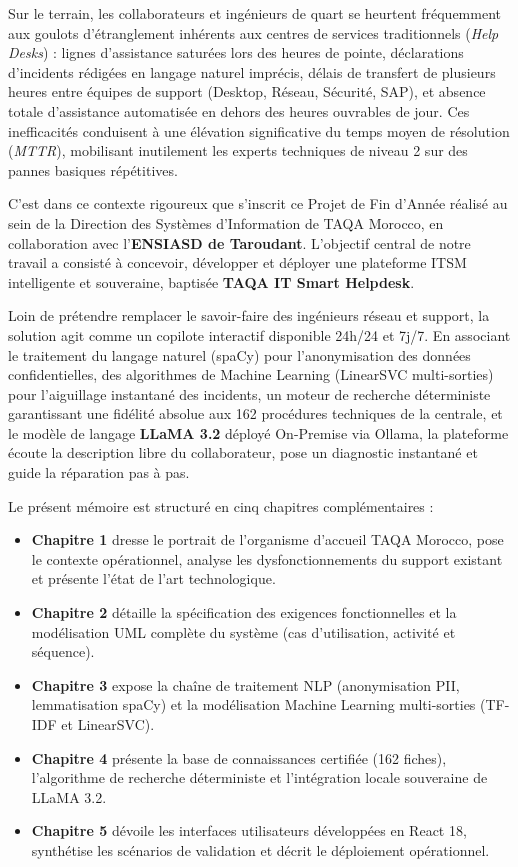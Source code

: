 \documentclass[12pt, a4paper, oneside]{report}
\begin{document}
Sur le terrain, les collaborateurs et ingénieurs de quart se heurtent fréquemment aux goulots d'étranglement inhérents aux centres de services traditionnels (\textit{Help Desks}) : lignes d'assistance saturées lors des heures de pointe, déclarations d'incidents rédigées en langage naturel imprécis, délais de transfert de plusieurs heures entre équipes de support (Desktop, Réseau, Sécurité, SAP), et absence totale d'assistance automatisée en dehors des heures ouvrables de jour. Ces inefficacités conduisent à une élévation significative du temps moyen de résolution (\textit{MTTR}), mobilisant inutilement les experts techniques de niveau 2 sur des pannes basiques répétitives.

C'est dans ce contexte rigoureux que s'inscrit ce Projet de Fin d'Année réalisé au sein de la Direction des Systèmes d'Information de TAQA Morocco, en collaboration avec l'\textbf{ENSIASD de Taroudant}. L'objectif central de notre travail a consisté à concevoir, développer et déployer une plateforme ITSM intelligente et souveraine, baptisée \textbf{TAQA IT Smart Helpdesk}.

Loin de prétendre remplacer le savoir-faire des ingénieurs réseau et support, la solution agit comme un copilote interactif disponible 24h/24 et 7j/7. En associant le traitement du langage naturel (spaCy) pour l'anonymisation des données confidentielles, des algorithmes de Machine Learning (LinearSVC multi-sorties) pour l'aiguillage instantané des incidents, un moteur de recherche déterministe garantissant une fidélité absolue aux 162 procédures techniques de la centrale, et le modèle de langage \textbf{LLaMA 3.2} déployé On-Premise via Ollama, la plateforme écoute la description libre du collaborateur, pose un diagnostic instantané et guide la réparation pas à pas.

Le présent mémoire est structuré en cinq chapitres complémentaires :
\begin{itemize}
  \item \textbf{Chapitre 1} dresse le portrait de l'organisme d'accueil TAQA Morocco, pose le contexte opérationnel, analyse les dysfonctionnements du support existant et présente l'état de l'art technologique.
  \item \textbf{Chapitre 2} détaille la spécification des exigences fonctionnelles et la modélisation UML complète du système (cas d'utilisation, activité et séquence).
  \item \textbf{Chapitre 3} expose la chaîne de traitement NLP (anonymisation PII, lemmatisation spaCy) et la modélisation Machine Learning multi-sorties (TF-IDF et LinearSVC).
  \item \textbf{Chapitre 4} présente la base de connaissances certifiée (162 fiches), l'algorithme de recherche déterministe et l'intégration locale souveraine de LLaMA 3.2.
  \item \textbf{Chapitre 5} dévoile les interfaces utilisateurs développées en React 18, synthétise les scénarios de validation et décrit le déploiement opérationnel.
\end{itemize}
\end{document}
